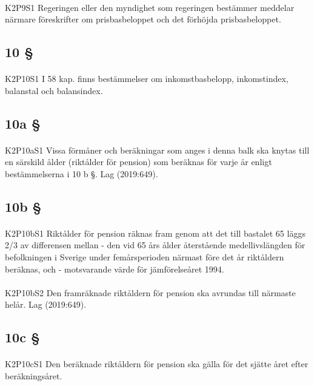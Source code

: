 \documentclass[a4paper,notitlepage,openany,10pt]{book}
\begin{document}
\paragraph*{}
{\tiny K2P9S1}
Regeringen eller den myndighet som regeringen bestämmer meddelar närmare föreskrifter om prisbasbeloppet och det förhöjda prisbasbeloppet.
\subsection*{10 §}
\paragraph*{}
{\tiny K2P10S1}
I 58 kap. finns bestämmelser om inkomstbasbelopp, inkomstindex, balanstal och balansindex.
\subsection*{10a §}
\paragraph*{}
{\tiny K2P10aS1}
Vissa förmåner och beräkningar som anges i denna balk ska knytas till en särskild ålder (riktålder för pension) som beräknas för varje år enligt bestämmelserna i 10 b §.
Lag (2019:649).
\subsection*{10b §}
\paragraph*{}
{\tiny K2P10bS1}
Riktålder för pension räknas fram genom att det till bastalet 65 läggs 2/3 av differensen mellan
\newline - den vid 65 års ålder återstående medellivslängden för befolkningen i Sverige under femårsperioden närmast före det år riktåldern beräknas, och
\newline - motsvarande värde för jämförelseåret 1994.
\paragraph*{}
{\tiny K2P10bS2}
Den framräknade riktåldern för pension ska avrundas till närmaste helår.
Lag (2019:649).
\subsection*{10c §}
\paragraph*{}
{\tiny K2P10cS1}
Den beräknade riktåldern för pension ska gälla för det sjätte året efter beräkningsåret.
\end{document}
